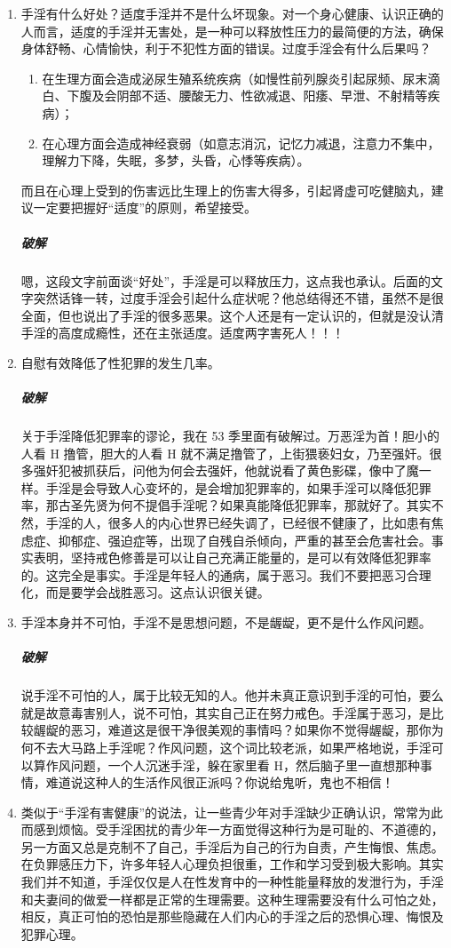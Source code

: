 \documentclass{ctexart}
\begin{document}
\begin{enumerate}
    \item 手淫有什么好处？适度手淫并不是什么坏现象。对一个身心健康、认识正确的人而言，适度的手淫并无害处，是一种可以释放性压力的最简便的方法，确保身体舒畅、心情愉快，利于不犯性方面的错误。过度手淫会有什么后果吗？\begin{enumerate}
        \item 在生理方面会造成泌尿生殖系统疾病（如慢性前列腺炎引起尿频、尿末滴白、下腹及会阴部不适、腰酸无力、性欲减退、阳痿、早泄、不射精等疾病）；
        \item 在心理方面会造成神经衰弱（如意志消沉，记忆力减退，注意力不集中，理解力下降，失眠，多梦，头昏，心悸等疾病）。
    \end{enumerate}而且在心理上受到的伤害远比生理上的伤害大得多，引起肾虚可吃健脑丸，建议一定要把握好“适度”的原则，希望接受。
    \subparagraph{破解} 嗯，这段文字前面谈“好处”，手淫是可以释放压力，这点我也承认。后面的文字突然话锋一转，过度手淫会引起什么症状呢？他总结得还不错，虽然不是很全面，但也说出了手淫的很多恶果。这个人还是有一定认识的，但就是没认清手淫的高度成瘾性，还在主张适度。适度两字害死人！！！
    \item 自慰有效降低了性犯罪的发生几率。
    \subparagraph{破解} 关于手淫降低犯罪率的谬论，我在 53 季里面有破解过。万恶淫为首！胆小的人看 H 撸管，胆大的人看 H 就不满足撸管了，上街猥亵妇女，乃至强奸。很多强奸犯被抓获后，问他为何会去强奸，他就说看了黄色影碟，像中了魔一样。手淫是会导致人心变坏的，是会增加犯罪率的，如果手淫可以降低犯罪率，那古圣先贤为何不提倡手淫呢？如果真能降低犯罪率，那就好了。其实不然，手淫的人，很多人的内心世界已经失调了，已经很不健康了，比如患有焦虑症、抑郁症、强迫症等，出现了自残自杀倾向，严重的甚至会危害社会。事实表明，坚持戒色修善是可以让自己充满正能量的，是可以有效降低犯罪率的。这完全是事实。手淫是年轻人的通病，属于恶习。我们不要把恶习合理化，而是要学会战胜恶习。这点认识很关键。
    \item 手淫本身并不可怕，手淫不是思想问题，不是龌龊，更不是什么作风问题。
    \subparagraph{破解} 说手淫不可怕的人，属于比较无知的人。他并未真正意识到手淫的可怕，要么就是故意毒害别人，说不可怕，其实自己正在努力戒色。手淫属于恶习，是比较龌龊的恶习，难道这是很干净很美观的事情吗？如果你不觉得龌龊，那你为何不去大马路上手淫呢？作风问题，这个词比较老派，如果严格地说，手淫可以算作风问题，一个人沉迷手淫，躲在家里看 H，然后脑子里一直想那种事情，难道说这种人的生活作风很正派吗？你说给鬼听，鬼也不相信！
    \item 类似于“手淫有害健康”的说法，让一些青少年对手淫缺少正确认识，常常为此而感到烦恼。受手淫困扰的青少年一方面觉得这种行为是可耻的、不道德的，另一方面又总是克制不了自己，手淫后为自己的行为自责，产生悔恨、焦虑。在负罪感压力下，许多年轻人心理负担很重，工作和学习受到极大影响。其实我们并不知道，手淫仅仅是人在性发育中的一种性能量释放的发泄行为，手淫和夫妻间的做爱一样都是正常的生理需要。这种生理需要没有什么可怕之处，相反，真正可怕的恐怕是那些隐藏在人们内心的手淫之后的恐惧心理、悔恨及犯罪心理。

\end{enumerate}
\end{document}
